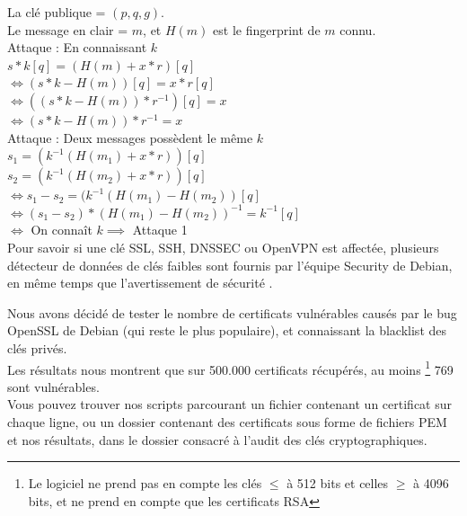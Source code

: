 		La clé publique = $(p, q, g)$.\\
		Le message en clair = $m$, et $H(m)$ est le fingerprint de $m$ connu.\\
	
		Attaque  : En connaissant $k$	\\
		$s * k [q] = (H(m) + x*r) [q]$\\
		$\iff (s * k - H(m)) [q] = x*r [q]$\\
		$\iff ((s*k - H(m))*r^{-1})[q] = x$\\
		$\iff (s*k - H(m))*r^{-1} = x$\\

		Attaque  : Deux messages possèdent le même $k$\\
		$s_1 = (k^{-1} (H(m_1) + x*r)) [q]$\\
		$s_2 = (k^{-1} (H(m_2) + x*r)) [q]$\\
		$\iff s_1 - s_2 = (k^{-1} (H(m_1) - H(m_2)) [q]$\\
		$\iff (s_1 - s_2)*(H(m_1) - H(m_2))^{-1} = k^{-1} [q]$\\
		$\iff$ On connaît $k \implies$ Attaque 1\\

		Pour savoir si une clé SSL, SSH, DNSSEC ou OpenVPN est affectée, 
		plusieurs détecteur de données \cite{dowkd.pl} 
		\cite{openssl-blacklist} de clés faibles sont 
		fournis par l'équipe Security de Debian, en même temps que
		l'avertissement de sécurité \cite{debian2008bug}.\\ 


		Nous avons décidé de tester le nombre de certificats vulnérables 
		causés 	par le bug OpenSSL de Debian (qui reste le plus populaire), et
		connaissant la blacklist des clés privés. \\
	
		Les résultats nous montrent que sur 500.000 certificats récupérés, au moins
		\footnote{Le logiciel ne prend pas en compte les clés $\leq$ à 512 bits et 
		celles $\geq$ à 4096 bits, et ne prend en compte que les certificats RSA} 
		769 sont vulnérables.\\
		
		Vous pouvez trouver nos scripts parcourant un fichier contenant un 
		certificat sur chaque ligne, ou un dossier contenant des certificats sous 
		forme de fichiers PEM et nos résultats, dans le dossier consacré à l'audit des clés
		cryptographiques.\\
		
